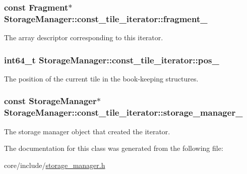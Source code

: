 \subsubsection[{fragment\+\_\+}]{\setlength{\rightskip}{0pt plus 5cm}const {\bf Fragment}$\ast$ Storage\+Manager\+::const\+\_\+tile\+\_\+iterator\+::fragment\+\_\+\hspace{0.3cm}{\ttfamily [private]}}\label{classStorageManager_1_1const__tile__iterator_ac416f61eeaea36b46e4949bd27644d08}
The array descriptor corresponding to this iterator. \hypertarget{classStorageManager_1_1const__tile__iterator_aced6cade854a8ca593a55f3e2c35ff79}{}
\subsubsection[{pos\+\_\+}]{\setlength{\rightskip}{0pt plus 5cm}int64\+\_\+t Storage\+Manager\+::const\+\_\+tile\+\_\+iterator\+::pos\+\_\+\hspace{0.3cm}{\ttfamily [private]}}\label{classStorageManager_1_1const__tile__iterator_aced6cade854a8ca593a55f3e2c35ff79}
The position of the current tile in the book-\/keeping structures. \hypertarget{classStorageManager_1_1const__tile__iterator_a79b72bf934834fcbcffbb8b4ceee9b0a}{}
\subsubsection[{storage\+\_\+manager\+\_\+}]{\setlength{\rightskip}{0pt plus 5cm}const {\bf Storage\+Manager}$\ast$ Storage\+Manager\+::const\+\_\+tile\+\_\+iterator\+::storage\+\_\+manager\+\_\+\hspace{0.3cm}{\ttfamily [private]}}\label{classStorageManager_1_1const__tile__iterator_a79b72bf934834fcbcffbb8b4ceee9b0a}
The storage manager object that created the iterator. 

The documentation for this class was generated from the following file\+:\begin{DoxyCompactItemize}
\item 
core/include/\hyperlink{storage__manager_8h}{storage\+\_\+manager.\+h}\end{DoxyCompactItemize}
